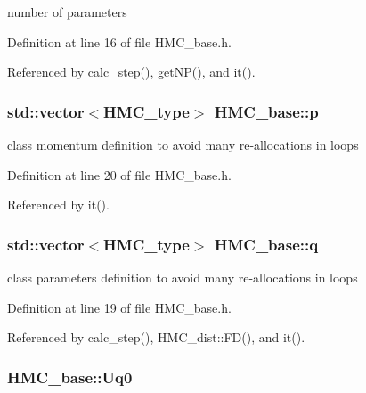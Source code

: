 number of parameters 



Definition at line 16 of file H\-M\-C\-\_\-base.\-h.



Referenced by calc\-\_\-step(), get\-N\-P(), and it().

\hypertarget{class_h_m_c__base_a138936eeaf2656aa5f2d51395c8e68f5}{
\subsubsection[{p}]{\setlength{\rightskip}{0pt plus 5cm}std\-::vector$<${\bf H\-M\-C\-\_\-type}$>$ H\-M\-C\-\_\-base\-::p\hspace{0.3cm}{\ttfamily [private]}}}\label{class_h_m_c__base_a138936eeaf2656aa5f2d51395c8e68f5}


class momentum definition to avoid many re-\/allocations in loops 



Definition at line 20 of file H\-M\-C\-\_\-base.\-h.



Referenced by it().

\hypertarget{class_h_m_c__base_a9cb5e5ac7774b066976e6e9cac0dbfe8}{
\subsubsection[{q}]{\setlength{\rightskip}{0pt plus 5cm}std\-::vector$<${\bf H\-M\-C\-\_\-type}$>$ H\-M\-C\-\_\-base\-::q\hspace{0.3cm}{\ttfamily [private]}}}\label{class_h_m_c__base_a9cb5e5ac7774b066976e6e9cac0dbfe8}


class parameters definition to avoid many re-\/allocations in loops 



Definition at line 19 of file H\-M\-C\-\_\-base.\-h.



Referenced by calc\-\_\-step(), H\-M\-C\-\_\-dist\-::\-F\-D(), and it().

\hypertarget{class_h_m_c__base_af1b25a6ca516eebc2385c6359daeff32}{
\subsubsection[{Uq0}]{ H\-M\-C\-\_\-base\-::\-Uq0\hspace{0.3cm}{\ttfamily [private]}}}\label{class_h_m_c__base_af1b25a6ca516eebc2385c6359daeff32}


